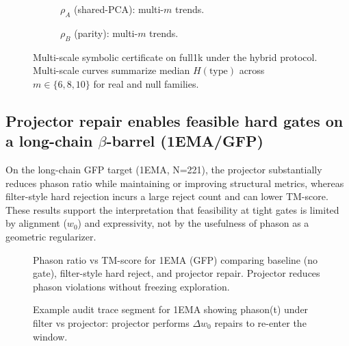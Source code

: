 \begin{figure}[t]
  \centering
  \begin{subfigure}[t]{0.49\linewidth}
    \centering
    \caption{$\rho_A$ (shared-PCA): multi-$m$ trends.}
  \end{subfigure}
  \hfill
  \begin{subfigure}[t]{0.49\linewidth}
    \centering
    \caption{$\rho_B$ (parity): multi-$m$ trends.}
  \end{subfigure}
  \caption{Multi-scale symbolic certificate on full1k under the hybrid protocol. Multi-scale curves summarize median $H(\mathrm{type})$ across $m\in\{6,8,10\}$ for real and null families.}
  \label{fig:auric_multiscale_full1k}
\end{figure}

\subsection{Projector repair enables feasible hard gates on a long-chain $\beta$-barrel (1EMA/GFP)}

On the long-chain GFP target (1EMA, N=221), the projector substantially reduces phason ratio while maintaining or improving structural metrics, whereas filter-style hard rejection incurs a large reject count and can lower TM-score. These results support the interpretation that feasibility at tight gates is limited by alignment ($w_0$) and expressivity, not by the usefulness of phason as a geometric regularizer.

\begin{figure}[t]
  \centering
  \caption{Phason ratio vs TM-score for 1EMA (GFP) comparing baseline (no gate), filter-style hard reject, and projector repair. Projector reduces phason violations without freezing exploration.}
  \label{fig:4}
\end{figure}

\begin{figure}[t]
  \centering
  \caption{Example audit trace segment for 1EMA showing phason(t) under filter vs projector: projector performs $\Delta w_0$ repairs to re-enter the window.}
  \label{fig:5}
\end{figure}

